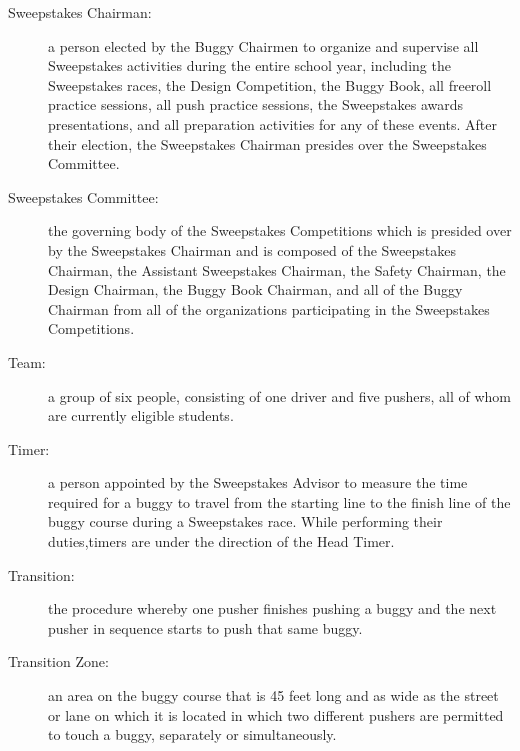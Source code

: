 \begin{description}
	\item[Sweepstakes Chairman:]
	a person elected by the Buggy Chairmen to organize and supervise all Sweepstakes activities during the entire school year, including the Sweepstakes races, the Design Competition, the Buggy Book, all freeroll practice sessions, all push practice sessions, the Sweepstakes awards presentations, and all preparation activities for any of these events. After their election, the Sweepstakes Chairman presides over the Sweepstakes Committee.

	\item[Sweepstakes Committee:]
	the governing body of the Sweepstakes Competitions which is presided over by the Sweepstakes Chairman and is composed of the Sweepstakes Chairman, the Assistant Sweepstakes Chairman, the Safety Chairman, the Design Chairman, the Buggy Book Chairman, and all of the Buggy Chairman from all of the organizations participating in the Sweepstakes Competitions.

	\item[Team:]
	a group of six people, consisting of one driver and five pushers, all of whom are currently eligible students.

	\item[Timer:]
	a person appointed by the Sweepstakes Advisor to measure the time required for a buggy to travel from the starting line to the finish line of the buggy course during a Sweepstakes race. While performing their duties,timers are under the direction of the Head Timer.

	\item[Transition:]
	the procedure whereby one pusher finishes pushing a buggy and the next pusher in sequence starts to push that same buggy.

	\item[Transition Zone:]
	an area on the buggy course that is 45 feet long and as wide as the street or lane on which it is located in which two different pushers are permitted to touch a buggy, separately or simultaneously.

\end{description}

